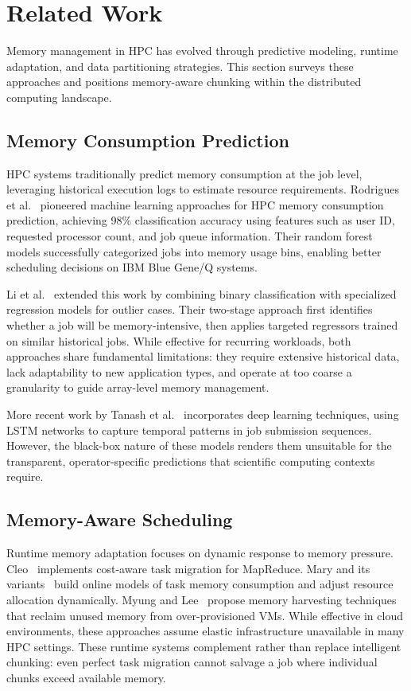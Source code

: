 \section{Related Work}
\label{sec:related-work}

Memory management in \ac{HPC} has evolved through predictive modeling, runtime adaptation, and data partitioning strategies.
This section surveys these approaches and positions memory-aware chunking within the distributed computing landscape.

\subsection{Memory Consumption Prediction}

\ac{HPC} systems traditionally predict memory consumption at the job level, leveraging historical execution logs to estimate resource requirements.
Rodrigues et al.~\cite{rodrigues2016} pioneered machine learning approaches for \ac{HPC} memory consumption prediction, achieving 98\% classification accuracy using features such as user ID, requested processor count, and job queue information.
Their random forest models successfully categorized jobs into memory usage bins, enabling better scheduling decisions on IBM Blue Gene/Q systems.

Li et al.~\cite{li2019} extended this work by combining binary classification with specialized regression models for outlier cases.
Their two-stage approach first identifies whether a job will be memory-intensive, then applies targeted regressors trained on similar historical jobs.
While effective for recurring workloads, both approaches share fundamental limitations: they require extensive historical data, lack adaptability to new application types, and operate at too coarse a granularity to guide array-level memory management.

More recent work by Tanash et al.~\cite{tanash2021ampro} incorporates deep learning techniques, using \ac{LSTM} networks to capture temporal patterns in job submission sequences.
However, the black-box nature of these models renders them unsuitable for the transparent, operator-specific predictions that scientific computing contexts require.

\subsection{Memory-Aware Scheduling}

Runtime memory adaptation focuses on dynamic response to memory pressure.
Cleo~\cite{khandelwal2020} implements cost-aware task migration for MapReduce.
Mary and its variants~\cite{thamsen2017} build online models of task memory consumption and adjust resource allocation dynamically.
Myung and Lee~\cite{myung2021} propose memory harvesting techniques that reclaim unused memory from over-provisioned VMs.
While effective in cloud environments, these approaches assume elastic infrastructure unavailable in many \ac{HPC} settings.
These runtime systems complement rather than replace intelligent chunking: even perfect task migration cannot salvage a job where individual chunks exceed available memory.

